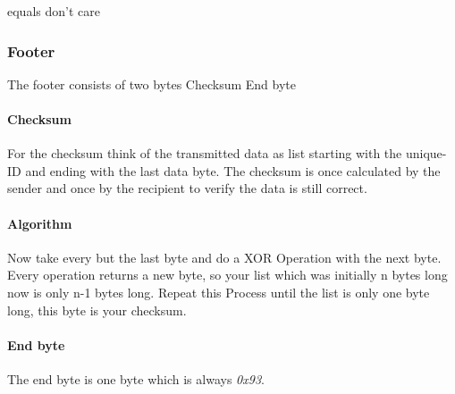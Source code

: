 \documentclass{article}
\begin{document}
    equals don't care

  \subsubsection{Footer}
    The footer consists of two bytes Checksum End byte

    \paragraph{Checksum}
     For the checksum think of the transmitted data as list starting with the
     unique-ID and ending with the last data byte. The checksum is once
     calculated by the sender and once by the recipient to verify the data is
     still correct.

    \paragraph{Algorithm}
     Now take every but the last byte and do a XOR Operation with the next byte.
     Every operation returns a new byte, so your list which was initially n
     bytes long now is only n-1 bytes long. Repeat this Process until the list
     is only one byte long, this byte is your checksum.

    \paragraph{End byte}
     The end byte is one byte which is always \emph{0x93}.
\end{document}
